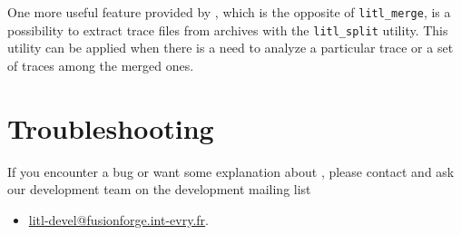 One more useful feature provided by \litl{}, which is the opposite of 
\texttt{litl\_merge}, is a possibility to extract trace files from archives 
with the \texttt{litl\_split} utility. This utility can be applied when there is 
a need to analyze a particular trace or a set of traces among the merged ones.

\begin{landscape}

\end{landscape}  
    
    
\chapter{Troubleshooting}
If you encounter a bug or want some explanation about \litl{}, please contact 
and ask our development team on the development mailing list
\begin{itemize}
 \item \url{litl-devel@fusionforge.int-evry.fr}.
\end{itemize}



\cleardoublepage
{}
{}
\small

\normalsize


